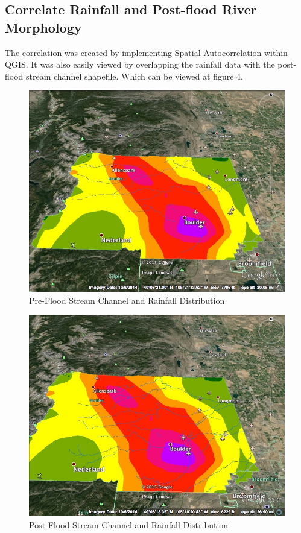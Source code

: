 \documentclass[twoside]{article}
\begin{document}
\begin{multicols}{2}
\subsection{Correlate Rainfall and Post-flood River Morphology}
The correlation was created by implementing Spatial Autocorrelation within QGIS. It was also easily viewed by overlapping the rainfall data with the post-flood stream channel shapefile. Which can be viewed at figure 4. 
\begin{figure}[!h] %
\includegraphics[width=2\columnwidth]{preflood.jpg}
\caption{Pre-Flood Stream Channel and Rainfall Distribution\label{fig:preflood}}
\end{figure}
\begin{figure}[!h] %
\includegraphics[width=2\columnwidth]{postflood.jpg}
\caption{Post-Flood Stream Channel and Rainfall Distribution\label{fig:postflood}}
\end{figure}


\end{multicols}
\end{document}
